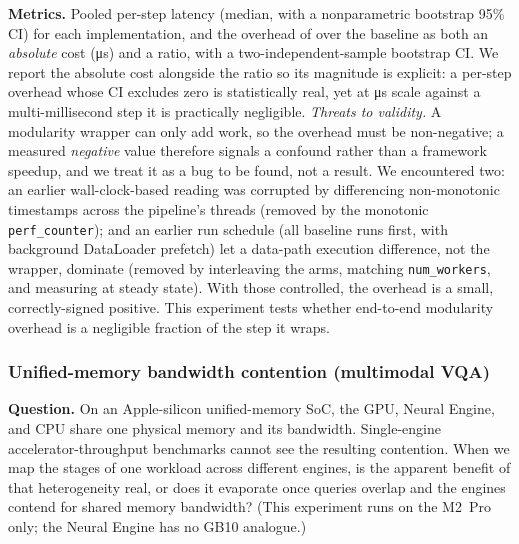 \textbf{Metrics.} Pooled per-step latency (median, with a nonparametric bootstrap
95\% CI) for each implementation, and the overhead of \sysname{} over the
baseline as both an \emph{absolute} cost (\si{\micro\second}) and a ratio, with a
two-independent-sample bootstrap CI. We report the absolute cost alongside the
ratio so its magnitude is explicit: a per-step overhead whose CI excludes zero is
statistically real, yet at \si{\micro\second} scale against a multi-millisecond
step it is practically negligible. \emph{Threats to validity.} A modularity
wrapper can only add work, so the overhead must be non-negative; a measured
\emph{negative} value therefore signals a confound rather than a framework
speedup, and we treat it as a bug to be found, not a result. We encountered two:
an earlier wall-clock-based reading was corrupted by differencing non-monotonic
timestamps across the pipeline's threads (removed by the monotonic
\texttt{perf\_counter}); and an earlier run schedule (all baseline runs first,
with background DataLoader prefetch) let a data-path execution difference, not the
wrapper, dominate (removed by interleaving the arms, matching \texttt{num\_workers},
and measuring at steady state). With those controlled, the overhead is a small,
correctly-signed positive. This experiment tests whether end-to-end modularity
overhead is a negligible fraction of the step it wraps.

\subsubsection{Unified-memory bandwidth contention (multimodal VQA)}
\label{sec:exp-bandwidth}

\textbf{Question.} On an Apple-silicon unified-memory SoC, the GPU, Neural
Engine, and CPU share one physical memory and its bandwidth. Single-engine
accelerator-throughput benchmarks cannot see the resulting contention. When we
map the stages of one workload across different engines, is the apparent benefit
of that heterogeneity real, or does it evaporate once queries overlap and the
engines contend for shared memory bandwidth? (This experiment runs on the
M2~Pro only; the Neural Engine has no GB10 analogue.)

